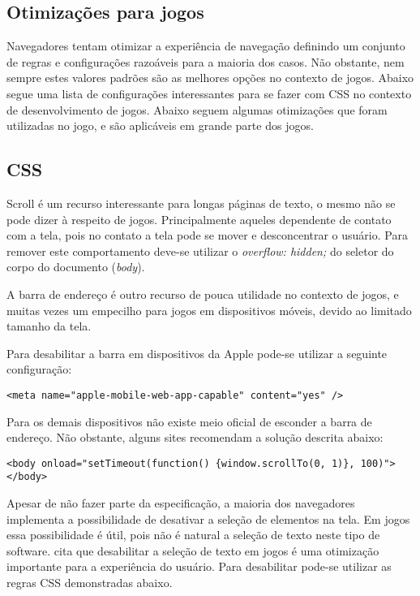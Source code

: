 \begin{draft}

\section{Otimizações para jogos}

Navegadores tentam otimizar a experiência de navegação definindo
um conjunto de regras e configurações razoáveis para a maioria dos
casos. Não obstante, nem sempre estes valores padrões são as melhores
opções no contexto de jogos. Abaixo segue uma lista de configurações
interessantes para se fazer com CSS no contexto de desenvolvimento de
jogos.
Abaixo seguem algumas otimizações que foram utilizadas no jogo, e são  aplicáveis 
em grande parte dos jogos.

\subsection{CSS}

Scroll é um recurso interessante para longas páginas de texto,
o mesmo não se pode dizer à respeito de jogos.
Principalmente aqueles dependente de contato com a tela, pois
no contato a tela pode se mover e desconcentrar o usuário. Para
remover este comportamento deve-se utilizar o \textit{overflow:
hidden;} do seletor do corpo do documento (\textit{body}).

A barra de endereço é outro recurso de pouca utilidade no contexto de
jogos, e muitas vezes um empecilho para jogos em dispositivos móveis,
devido ao limitado tamanho da tela.

Para desabilitar a barra em dispositivos da Apple pode-se utilizar a
seguinte configuração:

\begin{verbatim}
<meta name="apple-mobile-web-app-capable" content="yes" />
\end{verbatim}

Para os demais dispositivos não existe meio oficial de esconder a barra
de endereço. Não obstante, alguns sites recomendam a solução descrita abaixo:

\begin{verbatim}
<body onload="setTimeout(function() {window.scrollTo(0, 1)}, 100)">
</body>
\end{verbatim}

Apesar de não fazer parte da especificação, a maioria dos navegadores
implementa a possibilidade de desativar a seleção de elementos na tela.
Em jogos essa possibilidade é útil, pois não é natural a seleção de texto
neste tipo de software. \cite{html5mostwanted} cita que desabilitar
a seleção de texto em jogos é uma otimização importante para a
experiência do usuário. Para desabilitar pode-se utilizar as regras
CSS demonstradas abaixo.


\end{draft}
